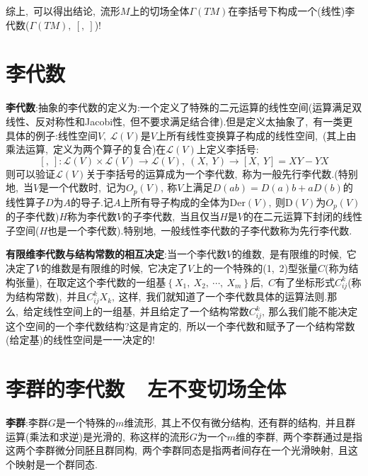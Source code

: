 综上,\ 可以得出结论,\ 流形$M$上的切场全体$\Gamma(TM)$在李括号下构成一个(线性)李代数($\Gamma(TM),\ [,\ ]$)!
\section{李代数}
\textbf{李代数}:抽象的李代数的定义为:一个定义了特殊的二元运算的线性空间(运算满足双线性、反对称性和Jacobi性,\ 但不要求满足结合律).但是定义太抽象了,\ 有一类更具体的例子:线性空间$V,\ \mathcal{L}(V)$是$V$上所有线性变换算子构成的线性空间,\ (其上由乘法运算,\ 定义为两个算子的复合)在$\mathcal{L}(V)$上定义李括号:
$$[,\ ]:\mathcal{L}(V)\times\mathcal{L}(V)\rightarrow\mathcal{L}(V),\ (X,\ Y)\rightarrow[X,\ Y]=XY-YX$$
则可以验证$\mathcal{L}(V)$关于李括号的运算成为一个李代数,\ 称为一般先行李代数.(特别地,\ 当$V$是一个代数时,\ 记为$O_p(V),\ $称$V$上满足$D(ab)=D(a)b+aD(b)$的线性算子$D$为$A$的导子.记$A$上所有导子构成的全体为$\mathrm{Der}(V),\ $则$\mathrm{D}(V)$为$O_p(V)$的子李代数)$H$称为李代数$V$的子李代数,\ 当且仅当$H$是$V$的在二元运算下封闭的线性子空间($H$也是一个李代数).特别地,\ 一般线性李代数的子李代数称为先行李代数.

\textbf{有限维李代数与结构常数的相互决定}:当一个李代数$V$的维数,\ 是有限维的时候,\ 它决定了$V$的维数是有限维的时候,\ 它决定了$V$上的一个特殊的(1,\ 2)型张量$C$(称为结构张量),\ 在取定这个李代数的一组基$\left\{X_1,\ X_2,\ \cdots,\ X_m\right\}$后,\ $C$有了坐标形式$C_{ij}^{k}$(称为结构常数),\ 并且$C_{ij}^kX_k,\ $这样,\ 我们就知道了一个李代数具体的运算法则.那么,\ 给定线性空间上的一组基,\ 并且给定了一个结构常数$C_{ij}^{k},\ $那么我们能不能决定这个空间的一个李代数结构?这是肯定的,\ 所以一个李代数和赋予了一个结构常数(给定基)的线性空间是一一决定的!

\section{李群的李代数\ \raisebox{0.5mm}{------}\ 左不变切场全体}

\textbf{李群}:李群$G$是一个特殊的$m$维流形,\ 其上不仅有微分结构,\ 还有群的结构,\ 并且群运算(乘法和求逆)是光滑的,\ 称这样的流形$G$为一个$m$维的李群,\ 两个李群通过是指这两个李群微分同胚且群同构,\ 两个李群同态是指两者间存在一个光滑映射,\ 且这个映射是一个群同态.

